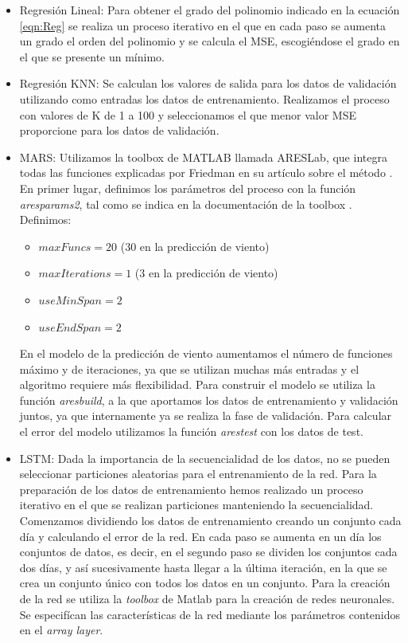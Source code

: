 \documentclass[journal]{IEEEtran}
\begin{document}
\begin{itemize}
    \item Regresión Lineal: Para obtener el grado del polinomio indicado en la ecuación \ref{eqn:Reg} se realiza un proceso iterativo en el que en cada paso se aumenta un grado el orden del polinomio y se calcula el MSE, escogiéndose el grado en el que se presente un mínimo. 
    \item Regresión KNN: Se calculan los valores de salida para los datos de validación utilizando como entradas los datos de entrenamiento. Realizamos el proceso con valores de K de 1 a 100 y seleccionamos el que menor valor MSE proporcione para los datos de validación.
    \item MARS: Utilizamos la toolbox de MATLAB llamada ARESLab, que integra todas las funciones explicadas por Friedman en su artículo sobre el método \cite{JHFRIEDMAN1991}. En primer lugar, definimos los parámetros del proceso con la función \emph{aresparams2}, tal como se indica en la documentación de la toolbox \cite{ARESLAB2016}. Definimos:
    \begin{itemize}
        \item $maxFuncs = 20$ ($30$ en la predicción de viento)
        \item $maxIterations = 1$ ($3$ en la predicción de viento)
        \item $useMinSpan = 2$
        \item $useEndSpan = 2$
    \end{itemize}
    En el modelo de la predicción de viento aumentamos el número de funciones máximo y de iteraciones, ya que se utilizan muchas más entradas y el algoritmo requiere más flexibilidad.
    Para construir el modelo se utiliza la función \emph{aresbuild}, a la que aportamos los datos de entrenamiento y validación juntos, ya que internamente ya se realiza la fase de validación.
    Para calcular el error del modelo utilizamos la función \emph{arestest} con los datos de test.
    \item LSTM: Dada la importancia de la secuencialidad de los datos, no se pueden seleccionar particiones aleatorias para el entrenamiento de la red.  Para la preparación de los datos de entrenamiento hemos realizado un proceso iterativo en el que se realizan particiones manteniendo la secuencialidad. Comenzamos dividiendo los datos de entrenamiento creando un conjunto cada día y calculando el error de la red. En cada paso se aumenta en un día los conjuntos de datos, es decir, en el segundo paso se dividen los conjuntos cada dos días, y así sucesivamente hasta llegar a la última iteración, en la que se crea un conjunto único con todos los datos en un conjunto.
    Para la creación de la red se utiliza la \emph{toolbox} de Matlab para la creación de redes neuronales. Se especifícan las características de la red mediante los parámetros contenidos en el \emph{array layer}.

\end{itemize}
\end{document}
